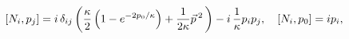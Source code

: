 \begin{equation}\label{c}
[N_i, p_j] =  i\,  \delta_{ij}
 \left(  {\kappa\over 2} \left( 1-e^{- 2{p_{0}/ \kappa}}
 \right) + {1\over 2\kappa} \vec{p}\,{}^{ 2}\, \right) - i\,
{1\over \kappa} p_{i}p_{j} ,\quad [N_i, p_0] = i p_i,
\end{equation}


